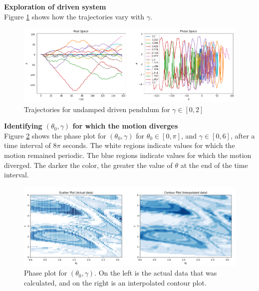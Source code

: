 \documentclass[12pt]{article}
\newenvironment{problem}[2][]{\begin{trivlist}
\item[\hskip \labelsep {\bfseries #1}\hskip \labelsep {\bfseries #2.}]}{\end{trivlist}}
\begin{document}
\begin{problem}{4}
	\textbf{Exploration of driven system} \\
	Figure \ref{driving2} shows how the trajectories vary with $\gamma$.  

\begin{figure}[ht!]
	\centering
	\includegraphics[scale=0.5]{../figures/driving2.png}
	\caption{Trajectories for undamped driven pendulum for $\gamma \in [0,2]$}
	\label{driving2}
\end{figure}
\end{problem}

\begin{problem}{5}
	\textbf{Identifying $(\theta_{0},\gamma)$ for which the motion diverges} \\

	Figure \ref{diverge} shows the phase plot for $(\theta_{0},\gamma)$ for $\theta_{0} \in [0,\pi]$, and $\gamma \in [0,6]$, after a time interval of $8\pi$ seconds.  The white regions indicate values for which the motion remained periodic. The blue regions indicate values for which the motion diverged.  The darker the color, the greater the value of $\theta$ at the end of the time interval.
\begin{figure}[h!]
	\centering
  	\includegraphics[scale=0.5]{../figures/diverge2.png}
 	\caption{Phase plot for $(\theta_{0},\gamma)$. On the left is the actual data that was calculated, and on the right is an interpolated contour plot.}
  	\label{diverge}
\end{figure}
\end{problem}
\end{document}
